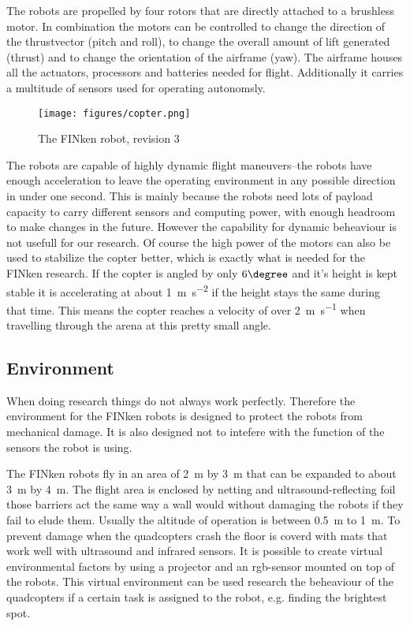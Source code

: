 The robots are propelled by four rotors that are directly attached to a brushless motor.
In combination the motors can be controlled to change the direction of the thrustvector (pitch and roll), to change the overall amount of lift generated (thrust) and to change the orientation of the airframe (yaw).
The airframe houses all the actuators, processors and batteries needed for flight.
Additionally it carries a multitude of sensors used for operating autonomsly.

\begin{figure}[H]
	\centering
\texttt{[image: figures/copter.png]}
\label{copterfoto}
\caption{The FINken robot, revision 3}
\end{figure}

The robots are capable of highly dynamic flight maneuvers–the robots have enough acceleration to leave the operating environment in any possible direction in under one second.
This is mainly because the robots need lots of payload capacity to carry different sensors and computing power, with enough headroom to make changes in the future.
However the capability for dynamic beheaviour is not usefull for our research.
Of course the high power of the motors can also be used to stabilize the copter better, which is exactly what is needed for the FINken research.
If the copter is angled by only $6\degree$ and it's height is kept stable it is accelerating at about \SI{1}{\metre\per\square\second} if the height stays the same during that time.
This means the copter reaches a velocity of over \SI{2}{\metre\per\second} when travelling through the arena at this pretty small angle. 

\subsection{Environment}
When doing research things do not always work perfectly.
Therefore the environment for the FINken robots is designed to protect the robots from mechanical damage.
It is also designed not to intefere with the function of the sensors the robot is using. 

The FINken robots fly in an area of \SI{2}{\metre} by \SI{3}{\metre} that can be expanded to about \SI{3}{\metre} by \SI{4}{\metre}.
The flight area is enclosed by netting and ultrasound-reflecting foil those barriers act the same way a wall would without damaging the robots if they fail to elude them.
Usually the altitude of operation is between \SI{0.5}{\metre} to \SI{1}{\metre}.
To prevent damage when the quadcopters crash the floor is coverd with mats that work well with ultrasound and infrared sensors.
It is possible to create virtual environmental factors by using a projector and an rgb-sensor mounted on top of the robots.
This virtual environment can be used research the beheaviour of the quadcopters if a certain task is assigned to the robot, e.g. finding the brightest spot.


